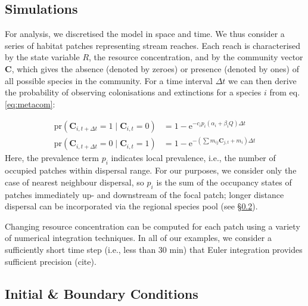 \subsection{Simulations}

For analysis, we discretised the model in space and time.
We thus consider a series of habitat patches representing stream reaches.
Each reach is characterised by the state variable $R$, the resource concentration, and by the community vector $\mathbf{C}$, which gives the absence (denoted by zeroes) or presence (denoted by ones) of all possible species in the community.
For a time interval $\Delta t$ we can then derive the probability of observing colonisations and extinctions for a species $i$ from eq. \ref{eq:metacom}:

\begin{equation}
\begin{split}
	\mathrm{pr}\left( \mathbf{C}_{i, t+\Delta t} = 1 \mid \mathbf{C}_{i, t} = 0\right) &= 
			1 - \mathrm{e}^{-c_i p_i(\alpha_i + \beta_iQ) \Delta t} \\
	\mathrm{pr}\left( \mathbf{C}_{i, t+\Delta t} = 0 \mid \mathbf{C}_{i, t} = 1\right) &= 
			1 - \mathrm{e}^{-\left( \sum{m_{ij}\mathbf{C}_{j, t}} + m_i \right)\Delta t}
	\label{eq:ceprob}
\end{split}
\end{equation}
Here, the prevalence term $p_i$ indicates local prevalence, i.e., the number of occupied patches within dispersal range.
For our purposes, we consider only the case of nearest neighbour dispersal, so $p_i$ is the sum of the occupancy states of patches immediately up- and downstream of the focal patch; longer distance dispersal can be incorporated via the regional species pool (see §\ref{ss:initial-boundary}).

Changing resource concentration can be computed for each patch using a variety of numerical integration techniques.
In all of our examples, we consider a sufficiently short time step (i.e., less than 30 min) that Euler integration provides sufficient precision (cite).

\subsection{Initial \& Boundary Conditions} \label{ss:initial-boundary}

